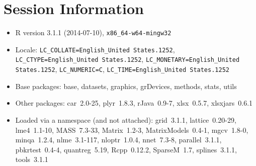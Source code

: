 \documentclass{article}
\begin{document}
\section*{Session Information}
\begin{itemize}\raggedright
  \item R version 3.1.1 (2014-07-10), \verb|x86_64-w64-mingw32|
  \item Locale: \verb|LC_COLLATE=English_United States.1252|, \verb|LC_CTYPE=English_United States.1252|, \verb|LC_MONETARY=English_United States.1252|, \verb|LC_NUMERIC=C|, \verb|LC_TIME=English_United States.1252|
  \item Base packages: base, datasets, graphics, grDevices, methods,
    stats, utils
  \item Other packages: car~2.0-25, plyr~1.8.3, rJava~0.9-7,
    xlsx~0.5.7, xlsxjars~0.6.1
  \item Loaded via a namespace (and not attached): grid~3.1.1,
    lattice~0.20-29, lme4~1.1-10, MASS~7.3-33, Matrix~1.2-3,
    MatrixModels~0.4-1, mgcv~1.8-0, minqa~1.2.4, nlme~3.1-117,
    nloptr~1.0.4, nnet~7.3-8, parallel~3.1.1, pbkrtest~0.4-4,
    quantreg~5.19, Rcpp~0.12.2, SparseM~1.7, splines~3.1.1, tools~3.1.1
\end{itemize}
\end{document}

